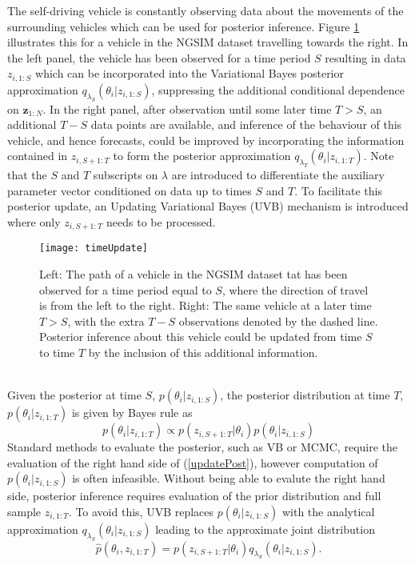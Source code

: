 \documentclass[12pt,a4paper]{article}\usepackage[]{graphicx}\usepackage[]{color}
\begin{document}
The self-driving vehicle is constantly observing data about the movements of the surrounding vehicles which can be used for posterior inference. Figure \ref{fig:timeUpdate} illustrates this for a vehicle in the NGSIM dataset travelling towards the right. In the left panel, the vehicle has been observed for a time period $S$ resulting in data $z_{i, 1:S}$ which can be incorporated into the Variational Bayes posterior approximation $q_{\lambda_S}(\theta_{i} | z_{i, 1:S})$, suppressing the additional conditional dependence on $\textbf{z}_{1:N}$. In the right panel, after observation until some later time $T > S$, an additional $T - S$ data points are available, and inference of the behaviour of this vehicle, and hence forecasts, could be improved by incorporating the information contained in $z_{i, S+1:T}$ to form the posterior approximation $q_{\lambda_T}(\theta_{i} | z_{i, 1:T})$. Note that the $S$ and $T$ subscripts on $\lambda$ are introduced to differentiate the auxiliary parameter vector conditioned on data up to times $S$ and $T$. To facilitate this posterior update, an Updating Variational Bayes (UVB) mechanism is introduced where only $z_{i, S+1:T}$ needs to be processed.
\begin{figure}[ht]
\centering
\texttt{[image: timeUpdate]}
\caption{Left: The path of a vehicle in the NGSIM dataset tat has been observed for a time period equal to $S$, where the direction of travel is from the left to the right. Right: The same vehicle at a later time $T > S$, with the extra $T - S$ observations denoted by the dashed line. Posterior inference about this vehicle could be updated from time $S$ to time $T$ by the inclusion of this additional information.}
\label{fig:timeUpdate}
\end{figure}
\\

Given the posterior at time $S$, $p(\theta_{i} | z_{i, 1:S})$, the posterior distribution at time $T$, $p(\theta_{i} | z_{i, 1:T})$ is given by Bayes rule as
\begin{equation}
\label{updatePost}
p(\theta_{i} | z_{i, 1:T}) \propto p(z_{i, S+1:T} | \theta_{i})p(\theta_{i} | z_{i, 1:S})
\end{equation}
Standard methods to evaluate the posterior, such as VB or MCMC, require the evaluation of the right hand side of (\ref{updatePost}), however computation of $p(\theta_{i} | z_{i, 1:S})$ is often infeasible. Without being able to evalute the right hand side, posterior inference requires evaluation of the prior distribution and full sample $z_{i, 1:T}$. To avoid this, UVB replaces $p(\theta_{i} | z_{i, 1:S})$ with the analytical approximation $q_{\lambda_S}(\theta_{i} | z_{i, 1:S})$ leading to the approximate joint distribution
\begin{equation}
\label{ApproxJoint}
\hat{p}(\theta_{i},  z_{i, 1:T}) = p(z_{i, S+1:T} | \theta_{i})q_{\lambda_S}(\theta_{i} | z_{i, 1:S}).
\end{equation}
\end{document}
